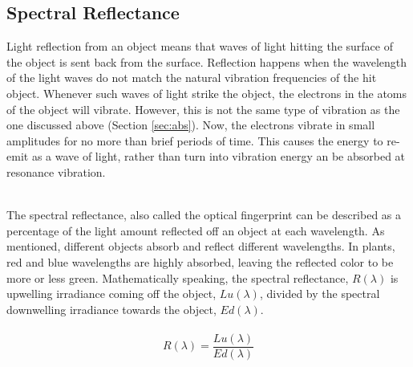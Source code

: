 \subsection{Spectral Reflectance}\label{sec:specref}
Light reflection from an object means that waves of light hitting the surface of the object is sent back from the surface. Reflection happens when the wavelength of the light waves do not match the natural vibration frequencies of the hit object. Whenever such waves of light strike the object, the electrons in the atoms of the object will vibrate. However, this is not the same type of vibration as the one discussed above (Section \ref{sec:abs}). Now, the electrons vibrate in small amplitudes for no more than brief periods of time. This causes the energy to re-emit as a wave of light, rather than turn into vibration energy an be absorbed at resonance vibration. 
\\\\

The spectral reflectance, also called the optical fingerprint can be described as a percentage of the light amount reflected off an object at each wavelength. As mentioned, different objects absorb and reflect different wavelengths. In plants, red and blue wavelengths are highly absorbed, leaving the reflected color to be more or less green. Mathematically speaking, the spectral reflectance, $R(\lambda)$ is upwelling irradiance coming off the object, $Lu(\lambda)$, divided by the spectral downwelling irradiance towards the object, $Ed(\lambda)$.
\\\\
\begin{equation} \label{eq:specref}
    R(\lambda) = \frac{Lu(\lambda)}{Ed(\lambda)}
\end{equation}
